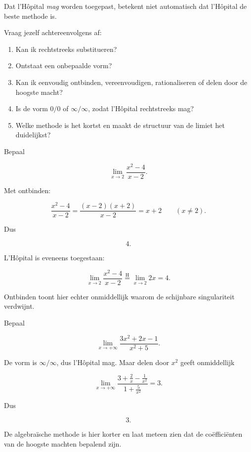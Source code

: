 \documentclass{ximera}
\begin{document}


Dat l'Hôpital \emph{mag} worden toegepast, betekent niet automatisch dat
l'Hôpital de beste methode is.

\begin{opmerking}
Vraag jezelf achtereenvolgens af:

\begin{enumerate}
  \item Kan ik rechtstreeks substitueren?
  \item Ontstaat een onbepaalde vorm?
  \item Kan ik eenvoudig ontbinden, vereenvoudigen, rationaliseren of delen door de hoogste macht?
  \item Is de vorm \(0/0\) of \(\infty/\infty\), zodat l'Hôpital rechtstreeks mag?
  \item Welke methode is het kortst en maakt de structuur van de limiet het duidelijkst?
\end{enumerate}
\end{opmerking}

\begin{voorbeeld}
Bepaal

\[\lim_{x\to2}\frac{x^2-4}{x-2}.\]

Met ontbinden:

\[
\frac{x^2-4}{x-2}
=
\frac{(x-2)(x+2)}{x-2}
=x+2
\qquad(x\neq2).
\]

Dus

\[\boxed{4}.\]

L'Hôpital is eveneens toegestaan:

\[
\lim_{x\to2}\frac{x^2-4}{x-2}
\overset{\mathrm H}{=}
\lim_{x\to2}2x
=4.
\]

Ontbinden toont hier echter onmiddellijk waarom de schijnbare
singulariteit verdwijnt.
\end{voorbeeld}

\begin{voorbeeld}
Bepaal

\[\lim_{x\to+\infty}\frac{3x^2+2x-1}{x^2+5}.\]

De vorm is \(\infty/\infty\), dus l'Hôpital mag. Maar delen door \(x^2\)
geeft onmiddellijk

\[
\lim_{x\to+\infty}
\frac{3+\frac2x-\frac1{x^2}}
{1+\frac5{x^2}}
=3.
\]

Dus

\[\boxed{3}.\]

De algebraïsche methode is hier korter en laat meteen zien dat de
coëfficiënten van de hoogste machten bepalend zijn.
\end{voorbeeld}
\end{document}
